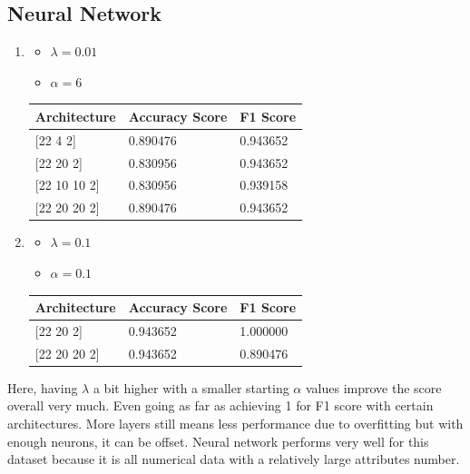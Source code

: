 \documentclass[letterpaper]{article}
\begin{document}
\subsection*{Neural Network}
\begin{enumerate}[label=(\alph*)]
	\item \begin{itemize}
		      \item $\lambda = 0.01$
		      \item $\alpha = 6$
	      \end{itemize}

	      \begin{table}[H]
		      \centering
		      \begin{tabular}{|l|l|l|}
			      \hline
			      Architecture     & Accuracy Score & F1 Score \\ \hline
			      {[}22 4 2{]}     & 0.890476       & 0.943652 \\ \hline
			      {[}22 20 2{]}    & 0.830956       & 0.943652 \\ \hline
			      {[}22 10 10 2{]} & 0.830956       & 0.939158 \\ \hline
			      {[}22 20 20 2{]} & 0.890476       & 0.943652 \\ \hline
		      \end{tabular}
	      \end{table}
	\item \begin{itemize}
		      \item $\lambda = 0.1$
		      \item $\alpha = 0.1$
	      \end{itemize}

	      \begin{table}[H]
		      \centering
		      \begin{tabular}{|l|l|l|}
			      \hline
			      Architecture     & Accuracy Score & F1 Score \\ \hline
			      {[}22 20 2{]}    & 0.943652       & 1.000000 \\ \hline
			      {[}22 20 20 2{]} & 0.943652       & 0.890476 \\ \hline
		      \end{tabular}
	      \end{table}
\end{enumerate}

Here, having $\lambda$ a bit higher with a smaller starting $\alpha$ values improve the score overall very much. Even going as far as achieving 1 for F1
score with certain architectures. More layers still means less performance due to overfitting but with enough neurons, it can be offset. Neural network
performs very well for this dataset because it is all numerical data with a relatively large attributes number.
\end{document}
